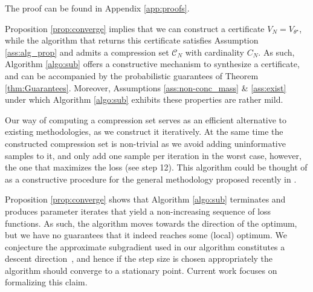 The proof can be found in Appendix \ref{app:proofs}.

Proposition \ref{prop:converge} implies that we can construct a certificate $V_N = V_{\theta^\star}$, while the algorithm that returns this certificate satisfies Assumption \ref{ass:alg_prop} and admits a compression set $\mathcal{C}_N$ with cardinality $C_N$. 
As such, Algorithm \ref{algo:sub} offers a constructive mechanism to synthesize a certificate, and can be accompanied by the probabilistic guarantees of Theorem \ref{thm:Guarantees}. 
Moreover, Assumptions \ref{ass:non-conc_mass} \& \ref{ass:exist} under which Algorithm \ref{algo:sub} exhibits these properties are rather mild.

Our way of computing a compression set serves as an efficient alternative to existing methodologies, as we construct it iteratively. 
At the same time the constructed compression set is non-trivial as we avoid adding uninformative samples to it, and only add one sample per iteration in the worst case, however, the one that maximizes the loss (see step 12).
This algorithm could be thought of as a constructive procedure for the general methodology proposed recently in \cite{DBLP:conf/nips/PaccagnanCG23}.

Proposition \ref{prop:converge} shows that Algorithm \ref{algo:sub} terminates and produces parameter iterates that yield a non-increasing sequence of loss functions. As such, the algorithm moves towards the direction of the optimum, but we have no guarantees that it indeed reaches some (local) optimum.
We conjecture the approximate subgradient used in our algorithm constitutes a descent direction~\cite{doi:10.1137/1.9781611971309}, and hence if the step size is chosen appropriately the algorithm should converge to a stationary point. Current work focuses on formalizing this claim.



